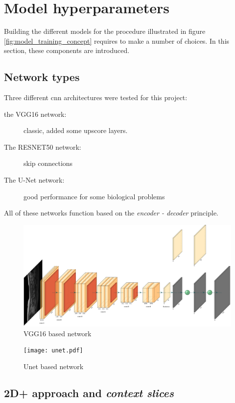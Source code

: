 \section{Model hyperparameters}

Building the different models for the procedure illustrated in figure \ref{fig:model_training_concept} requires to make a number of choices.
In this section, these components are introduced.

\subsection{Network types\label{sec:network_types}}

Three different \acrlong{cnn} architectures were tested for this project:
\begin{description}
    \item[the VGG16 network: ] classic, added some upscore layers.
    \item[The RESNET50 network:] skip connections
    \item[The U-Net network: ] good performance for some biological problems
\end{description}

All of these networks function based on the \textit{encoder - decoder} principle.

\begin{figure}
    \centering
    \includegraphics[width=.95\textwidth]{vgg16_upscore.pdf}
    \caption{VGG16 based network}
\end{figure}

\begin{figure}
    \centering
    \texttt{[image: unet.pdf]}
    \caption{Unet based network}
\end{figure}

\subsection{2D+ approach and \textit{context slices}\label{section:twoDplus}}

